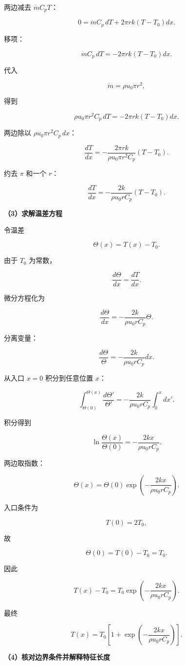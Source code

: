 \documentclass[12pt,a4paper,UTF8]{ctexart}
\begin{document}
两边减去 \(\dot mC_pT\)：

\[0=\dot mC_p\,dT
+2\pi rk(T-T_0)dx.\]

移项：

\[\dot mC_p\,dT
=-2\pi rk(T-T_0)dx.\]

代入

\[\dot m=\rho u_0\pi r^2,\]

得到

\[\rho u_0\pi r^2C_p\,dT
=-2\pi rk(T-T_0)dx.\]

两边除以 \(\rho u_0\pi r^2C_p\,dx\)：

\[\frac{dT}{dx}
=-\frac{2\pi rk}{\rho u_0\pi r^2C_p}
(T-T_0).\]

约去 \(\pi\) 和一个 \(r\)：

\[\boxed{
\frac{dT}{dx}
=-\frac{2k}{\rho u_0rC_p}(T-T_0)
}.\]

\textbf{（3）求解温差方程}

令温差

\[\Theta(x)=T(x)-T_0.\]

由于 \(T_0\) 为常数，

\[\frac{d\Theta}{dx}=\frac{dT}{dx}.\]

微分方程化为

\[\frac{d\Theta}{dx}
=-\frac{2k}{\rho u_0rC_p}\Theta.\]

分离变量：

\[\frac{d\Theta}{\Theta}
=-\frac{2k}{\rho u_0rC_p}dx.\]

从入口 \(x=0\) 积分到任意位置 \(x\)：

\[\int_{\Theta(0)}^{\Theta(x)}
\frac{d\Theta'}{\Theta'}
=-\frac{2k}{\rho u_0rC_p}
\int_0^x dx'.\]

积分得到

\[\ln\frac{\Theta(x)}{\Theta(0)}
=-\frac{2kx}{\rho u_0rC_p}.\]

两边取指数：

\[\Theta(x)
=\Theta(0)
\exp\left(
-\frac{2kx}{\rho u_0rC_p}
\right).\]

入口条件为

\[T(0)=2T_0,\]

故

\[\Theta(0)=T(0)-T_0=T_0.\]

因此

\[T(x)-T_0
=T_0
\exp\left(
-\frac{2kx}{\rho u_0rC_p}
\right).\]

最终

\[\boxed{
T(x)=T_0
\left[
1+\exp\left(
-\frac{2kx}{\rho u_0rC_p}
\right)
\right]
}.\]

\textbf{（4）核对边界条件并解释特征长度}
\end{document}
